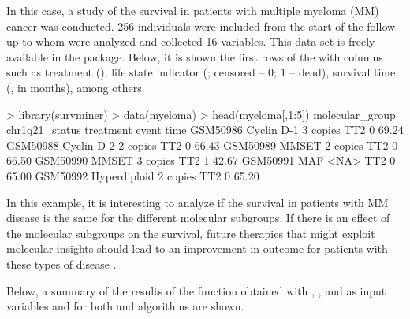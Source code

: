 In this case, a study of the survival in patients with multiple myeloma (MM) cancer was conducted. 256 individuals were included from the start of the follow-up to whom were analyzed and collected 16 variables. This data set is freely available in the  package. Below, it is shown the first rows of the  with columns such as treatment (), life state indicator (; censored -- 0; 1 -- dead), survival time (, in months), among others.

\newpage
\begin{example}
> library(survminer)
> data(myeloma)
> head(myeloma[,1:5])
         molecular_group chr1q21_status treatment event  time
GSM50986      Cyclin D-1       3 copies       TT2     0 69.24
GSM50988      Cyclin D-2       2 copies       TT2     0 66.43
GSM50989           MMSET       2 copies       TT2     0 66.50
GSM50990           MMSET       3 copies       TT2     1 42.67
GSM50991             MAF           <NA>       TT2     0 65.00
GSM50992    Hyperdiploid       2 copies       TT2     0 65.20
\end{example}


In this example, it is  interesting to analyze if the survival in patients with  MM disease  is the same for  the different  molecular subgroups. If there is an effect of the  molecular subgroups on the  survival, future therapies that might exploit molecular insights should lead to an improvement in outcome for patients with these types of disease \citep{blood}. 

Below, a summary of the results of the   function obtained with  , , and  as input variables and for both   and   algorithms are shown.

